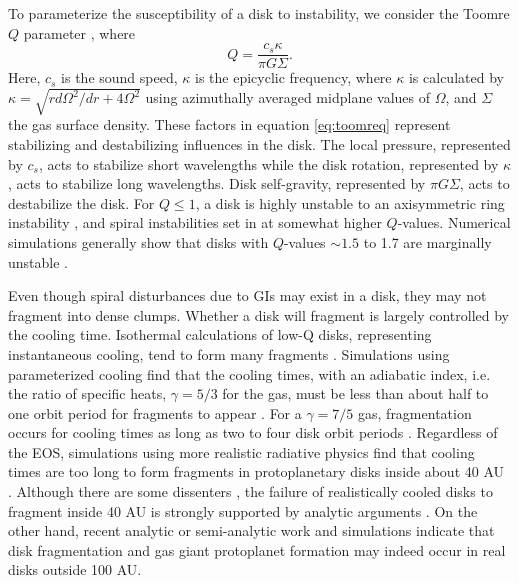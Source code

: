 To parameterize the susceptibility of a disk to instability, we consider the Toomre $Q$ parameter \citep{toomre1964}, where 
\begin{equation}
Q = \frac{c_s\kappa}{\pi G\Sigma}.
\label{eq:toomreq}
\end{equation}
Here, $c_s$ is the sound speed, $\kappa$ is the epicyclic frequency, where $\kappa$ is calculated by $\kappa = \sqrt{r d\Omega^2/dr + 4\Omega^2}$ using azimuthally averaged midplane values of $\Omega$, and $\Sigma$ the gas surface density. 
These factors in equation \eqref{eq:toomreq} represent stabilizing and destabilizing influences in the disk. The local pressure, represented by $c_s$, acts to stabilize short wavelengths while the disk rotation, represented by $\kappa$, acts to stabilize long wavelengths. Disk self-gravity, represented by $\pi G \Sigma$, acts to destabilize the disk. 
For $Q \leq 1$, a disk is highly unstable to an axisymmetric ring instability \citep{toomre1964}, and spiral instabilities set in at somewhat higher $Q$-values. Numerical simulations generally show that disks with $Q$-values $\sim 1.5$ to 1.7 are marginally unstable \citep{boss2000,pickett2003,durisen2007}.  

Even though spiral disturbances due to GIs may exist in a disk, they may not fragment into dense clumps. Whether a disk will fragment is largely controlled by the cooling time. Isothermal calculations of low-Q disks, representing instantaneous cooling, tend to form many fragments \citep{boss2000,pickett2003}. Simulations using parameterized cooling find that the cooling times, with an adiabatic index, i.e. the ratio of specific heats, $\gamma = 5/3$ for the gas, must be less than about half to one orbit period for fragments to appear \citep{gammie2001,rice2003b,mejia2005}. For a $\gamma = 7/5$ gas,  fragmentation occurs for cooling times as long as two to four disk orbit periods \citep{rice2005,clarke2007}. Regardless of the EOS, simulations using more realistic radiative physics find that cooling times are too long to form fragments  in protoplanetary disks inside about 40 AU \citep{cai2006,cai2008,boley2006,boley2007b,boley2008,stamatellos2008,forgan2009}. Although there are some dissenters \citep{boss2007,mayer2007}, the failure of realistically cooled disks to fragment inside 40 AU is strongly supported by analytic arguments \citep{rafikov2005,rafikov2007}.
On the other hand, recent analytic or semi-analytic work \citep{clarke2009,rafikov2009,dodson2009} and simulations \citep{stamatellos2009,boley2009,boley2010} indicate that disk fragmentation and gas giant protoplanet formation may indeed occur in real disks outside 100 AU. 


